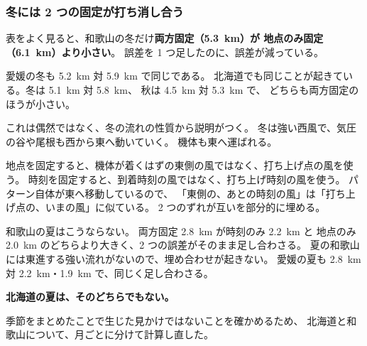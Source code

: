 \subsubsection{冬には 2 つの固定が打ち消し合う}

表をよく見ると、和歌山の冬だけ\textbf{両方固定（\SI{5.3}{\kilo\metre}）が
地点のみ固定（\SI{6.1}{\kilo\metre}）より小さい}。
誤差を 1 つ足したのに、誤差が減っている。

愛媛の冬も \SI{5.2}{\kilo\metre} 対 \SI{5.9}{\kilo\metre} で同じである。
北海道でも同じことが起きている。冬は \SI{5.1}{\kilo\metre} 対 \SI{5.8}{\kilo\metre}、
秋は \SI{4.5}{\kilo\metre} 対 \SI{5.3}{\kilo\metre} で、
どちらも両方固定のほうが小さい。

これは偶然ではなく、冬の流れの性質から説明がつく。
冬は強い西風で、気圧の谷や尾根も西から東へ動いていく。
機体も東へ運ばれる。

地点を固定すると、機体が着くはずの東側の風ではなく、打ち上げ点の風を使う。
時刻を固定すると、到着時刻の風ではなく、打ち上げ時刻の風を使う。
パターン自体が東へ移動しているので、
「東側の、あとの時刻の風」は「打ち上げ点の、いまの風」に似ている。
2 つのずれが互いを部分的に埋める。

和歌山の夏はこうならない。
両方固定 \SI{2.8}{\kilo\metre} が時刻のみ \SI{2.2}{\kilo\metre} と
地点のみ \SI{2.0}{\kilo\metre} のどちらより大きく、2 つの誤差がそのまま足し合わさる。
夏の和歌山には東進する強い流れがないので、埋め合わせが起きない。
愛媛の夏も \SI{2.8}{\kilo\metre} 対 \SI{2.2}{\kilo\metre}・\SI{1.9}{\kilo\metre} で、同じく足し合わさる。

\textbf{北海道の夏は、そのどちらでもない。}

季節をまとめたことで生じた見かけではないことを確かめるため、
北海道と和歌山について、月ごとに分けて計算し直した。


